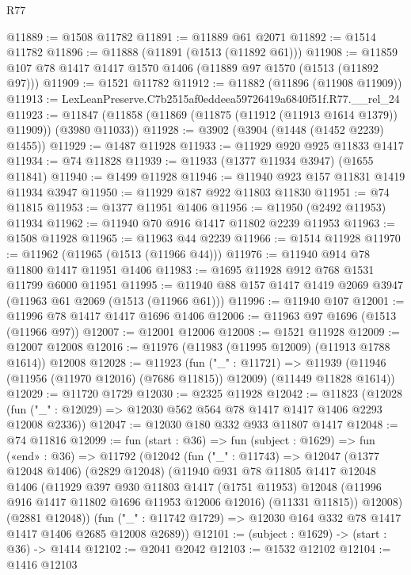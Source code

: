 \begin{lexlean}{R77}
\begin{coremodule}
{{@11889 := @1508 @11782
@11891 := @11889 @61 @2071
@11892 := @1514 @11782
@11896 := @11888 (@11891 (@1513 (@11892 @61)))
@11908 := @11859 @107 @78 @1417 @1417 @1570 @1406 (@11889 @97 @1570 (@1513 (@11892 @97)))
@11909 := @1521 @11782
@11912 := @11882 (@11896 (@11908 @11909))
@11913 := LexLeanPreserve.C7b2515af0eddeea59726419a6840f51f.R77.__rel_24
@11923 := @11847 (@11858 (@11869 (@11875 (@11912 (@11913 @1614 @1379)) @11909)) (@3980 @11033))
@11928 := @3902 (@3904 (@1448 (@1452 @2239) @1455))
@11929 := @1487 @11928
@11933 := @11929 @920 @925 @11833 @1417
@11934 := @74 @11828
@11939 := @11933 (@1377 @11934 @3947) (@1655 @11841)
@11940 := @1499 @11928
@11946 := @11940 @923 @157 @11831 @1419 @11934 @3947
@11950 := @11929 @187 @922 @11803 @11830
@11951 := @74 @11815
@11953 := @1377 @11951 @1406
@11956 := @11950 (@2492 @11953) @11934
@11962 := @11940 @70 @916 @1417 @11802 @2239 @11953
@11963 := @1508 @11928
@11965 := @11963 @44 @2239
@11966 := @1514 @11928
@11970 := @11962 (@11965 (@1513 (@11966 @44)))
@11976 := @11940 @914 @78 @11800 @1417 @11951 @1406
@11983 := @1695 @11928 @912 @768 @1531 @11799 @6000 @11951
@11995 := @11940 @88 @157 @1417 @1419 @2069 @3947 (@11963 @61 @2069 (@1513 (@11966 @61)))
@11996 := @11940 @107
@12001 := @11996 @78 @1417 @1417 @1696 @1406
@12006 := @11963 @97 @1696 (@1513 (@11966 @97))
@12007 := @12001 @12006
@12008 := @1521 @11928
@12009 := @12007 @12008
@12016 := @11976 (@11983 (@11995 @12009) (@11913 @1788 @1614)) @12008
@12028 := @11923
    (fun ("_" : @11721) =>
    @11939 (@11946 (@11956 (@11970 @12016) (@7686 @11815)) @12009) (@11449 @11828 @1614))
@12029 := @11720 @1729
@12030 := @2325 @11928
@12042 := @11823
    (@12028 (fun ("_" : @12029) => @12030 @562 @564 @78 @1417 @1417 @1406 @2293 @12008 @2336))
@12047 := @12030 @180 @332 @933 @11807 @1417
@12048 := @74 @11816
@12099 := fun (start : @36) =>
  fun (subject : @1629) =>
  fun («end» : @36) =>
  @11792
    (@12042
      (fun ("_" : @11743) =>
      @12047
        (@1377 @12048 @1406)
        (@2829 @12048)
        (@11940
          @931
          @78
          @11805
          @1417
          @12048
          @1406
          (@11929
            @397
            @930
            @11803
            @1417
            (@1751 @11953)
            @12048
            (@11996 @916 @1417 @11802 @1696 @11953 @12006 @12016)
            (@11331 @11815))
          @12008)
        (@2881 @12048))
      (fun ("_" : @11742 @1729) => @12030 @164 @332 @78 @1417 @1417 @1406 @2685 @12008 @2689))
@12101 := (subject : @1629) -> (start : @36) -> @1414
@12102 := @2041 @2042
@12103 := @1532 @12102
@12104 := @1416 @12103
}}
\end{coremodule}
\end{lexlean}

